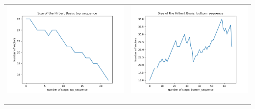 \documentclass[10pt]{article}
\begin{document}
\begin{tabular}{c|c}
\begin{minipage}{.4\textwidth}
\includegraphics[width=\textwidth]{"DATA/5d/5 generators 2 bound D/top_sequence SIZE"}
\end{minipage} &
\begin{minipage}{.4\textwidth}
\includegraphics[width=\textwidth]{"DATA/5d/5 generators 2 bound D bottomup/bottom_sequence SIZE"}
\end{minipage} \\ \\
\hline \\\begin{minipage}{.4\textwidth}

\end{minipage}
\end{tabular}
\end{document}
